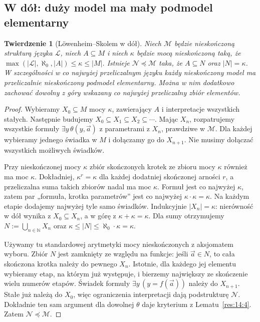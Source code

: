 \documentclass[11pt,a4paper]{article}
\numberwithin{equation}{section}
\theoremstyle{plain}
\newtheorem{twierdzenie}{Twierdzenie}[section]
\theoremstyle{definition}
\theoremstyle{remark}
\begin{document}
\subsection*{W dół: duży model ma mały podmodel elementarny}\label{sec:14:2}
\begin{twierdzenie}[Löwenheim--Skolem w dół]\label{res:14:5}
Niech $\mathcal M$ będzie nieskończoną strukturą języka $\mathcal L$, niech $A\subseteq M$ i niech $\kappa$ będzie mocą nieskończoną taką, że $\max(|\mathcal L|,\aleph_0,|A|)\le\kappa\le|M|$. Istnieje $\mathcal N\preccurlyeq\mathcal M$ taka, że $A\subseteq N$ oraz $|N|=\kappa$. W szczególności w co najwyżej przeliczalnym języku każdy nieskończony model ma przeliczalnie nieskończony podmodel elementarny. Można w nim dodatkowo zachować dowolny z góry wskazany co najwyżej przeliczalny zbiór elementów.
\end{twierdzenie}
\begin{proof}
Wybieramy $X_0\subseteq M$ mocy $\kappa$, zawierający $A$ i interpretacje wszystkich stałych. Następnie budujemy $X_0\subseteq X_1\subseteq X_2\subseteq\cdots$. Mając $X_n$, rozpatrujemy wszystkie formuły $\exists y\,\theta(y,\vec a)$ z parametrami z $X_n$, prawdziwe w $\mathcal M$. Dla każdej wybieramy jednego świadka w $M$ i dołączamy go do $X_{n+1}$. Nie musimy dołączać wszystkich możliwych świadków.

Przy nieskończonej mocy $\kappa$ zbiór skończonych krotek ze zbioru mocy $\kappa$ również ma moc $\kappa$. Dokładniej, $\kappa^r=\kappa$ dla każdej dodatniej skończonej arności $r$, a przeliczalna suma takich zbiorów nadal ma moc $\kappa$. Formuł jest co najwyżej $\kappa$, zatem par „formuła, krotka parametrów” jest co najwyżej $\kappa\cdot\kappa=\kappa$. Na każdym etapie dodajemy najwyżej tyle samo świadków. Indukcyjnie $|X_n|=\kappa$: nierówność w dół wynika z $X_0\subseteq X_n$, a w górę z $\kappa+\kappa=\kappa$. Dla sumy otrzymujemy $N:=\bigcup_{n\in\mathbb N}X_n$ oraz $\kappa\le|N|\le\aleph_0\cdot\kappa=\kappa$.

Używamy tu standardowej arytmetyki mocy nieskończonych z aksjomatem wyboru. Zbiór $N$ jest zamknięty ze względu na funkcje: jeśli $\vec a\in N$, to cała skończona krotka należy do pewnego $X_n$. Istotnie, dla każdego jej elementu wybieramy etap, na którym już występuje, i bierzemy największy ze skończenie wielu numerów etapów. Świadek formuły $\exists y\,(y=f(\vec a))$ należy do $X_{n+1}$. Stałe już należą do $X_0$, więc ograniczenia interpretacji dają podstrukturę $\mathcal N$. Dokładnie ten sam argument dla dowolnej $\theta$ daje kryterium z Lematu~\ref{res:14:4}. Zatem $\mathcal N\preccurlyeq\mathcal M$.
\end{proof}
\end{document}

